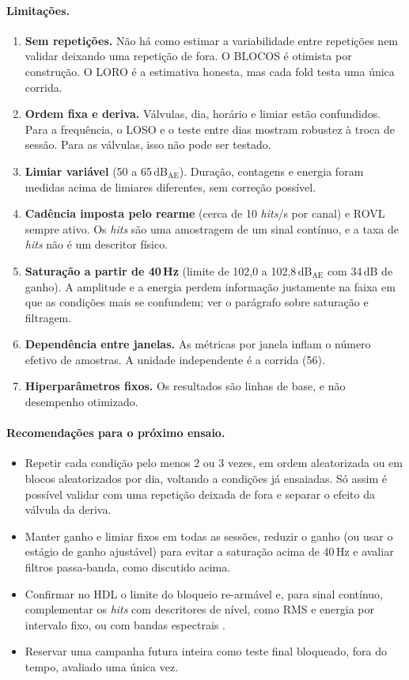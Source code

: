 \paragraph{Limitações.}
\begin{enumerate}
	\item \textbf{Sem repetições.} Não há como estimar a variabilidade entre repetições nem validar deixando uma repetição de fora. O BLOCOS é otimista por construção. O LORO é a estimativa honesta, mas cada fold testa uma única corrida.
	\item \textbf{Ordem fixa e deriva.} Válvulas, dia, horário e limiar estão confundidos. Para a frequência, o LOSO e o teste entre dias mostram robustez à troca de sessão. Para as válvulas, isso não pode ser testado.
	\item \textbf{Limiar variável} (50 a 65\,dB\(_{\mathrm{AE}}\)). Duração, contagens e energia foram medidas acima de limiares diferentes, sem correção possível.
	\item \textbf{Cadência imposta pelo rearme} (cerca de 10 \textit{hits}/s por canal) e ROVL sempre ativo. Os \textit{hits} são uma amostragem de um sinal contínuo, e a taxa de \textit{hits} não é um descritor físico.
	\item \textbf{Saturação a partir de 40\,Hz} (limite de 102,0 a 102,8\,dB\(_{\mathrm{AE}}\) com 34\,dB de ganho). A amplitude e a energia perdem informação justamente na faixa em que as condições mais se confundem; ver o parágrafo sobre saturação e filtragem.
	\item \textbf{Dependência entre janelas.} As métricas por janela inflam o número efetivo de amostras. A unidade independente é a corrida (56).
	\item \textbf{Hiperparâmetros fixos.} Os resultados são linhas de base, e não desempenho otimizado.
\end{enumerate}

\paragraph{Recomendações para o próximo ensaio.}
\begin{itemize}
	\item Repetir cada condição pelo menos 2 ou 3 vezes, em ordem aleatorizada ou em blocos aleatorizados por dia, voltando a condições já ensaiadas. Só assim é possível validar com uma repetição deixada de fora e separar o efeito da válvula da deriva.
	\item Manter ganho e limiar fixos em todas as sessões, reduzir o ganho (ou usar o estágio de ganho ajustável) para evitar a saturação acima de 40\,Hz e avaliar filtros passa-banda, como discutido acima.
	\item Confirmar no HDL o limite do bloqueio re-armável e, para sinal contínuo, complementar os \textit{hits} com descritores de nível, como RMS e energia por intervalo fixo, ou com bandas espectrais \cite{derakhshan1991}.
	\item Reservar uma campanha futura inteira como teste final bloqueado, fora do tempo, avaliado uma única vez.
\end{itemize}


